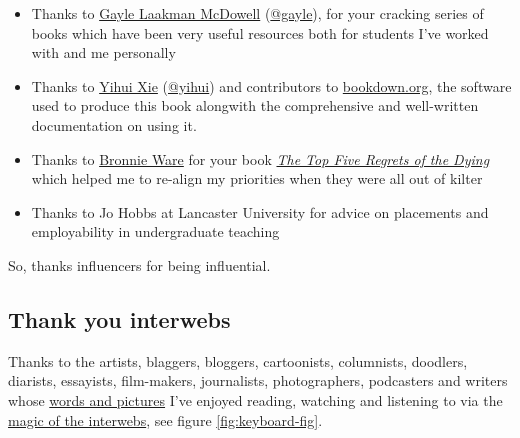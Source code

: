 \documentclass[
]{book}
\providecommand{\tightlist}{%
  \setlength{\itemsep}{0pt}\setlength{\parskip}{0pt}}
\begin{document}
\begin{itemize}
\tightlist
\item
  Thanks to \href{https://en.wikipedia.org/wiki/Gayle_Laakmann_McDowell}{Gayle Laakman McDowell} (\href{https://twitter.com/gayle}{@gayle}), for your cracking series of books \citep{techcareer, cracking, crackingpm, crackingthepmcareer} which have been very useful resources both for students I've worked with and me personally
\item
  Thanks to \href{https://en.wikipedia.org/wiki/Yihui_Xie}{Yihui Xie} (\href{https://github.com/yihui}{@yihui}) and contributors to \href{https://bookdown.org}{bookdown.org}, the software used to produce this book alongwith the comprehensive and well-written documentation on using it. \citep{xie2017, xie2015, xie2020}
\item
  Thanks to \href{https://en.wikipedia.org/wiki/Bronnie_Ware}{Bronnie Ware} for your book \emph{\href{https://en.wikipedia.org/wiki/The_Top_Five_Regrets_of_the_Dying}{The Top Five Regrets of the Dying}} \citep{regrets} which helped me to re-align my priorities when they were all out of kilter
\item
  Thanks to Jo Hobbs at Lancaster University for advice on placements and employability in undergraduate teaching
\end{itemize}

So, thanks influencers for being influential. 🙏

\hypertarget{bloggers}{%
\subsection{Thank you interwebs}\label{bloggers}}

Thanks to the artists, blaggers, bloggers, cartoonists, columnists, doodlers, diarists, essayists, film-makers, journalists, photographers, podcasters and writers whose \href{https://en.wikipedia.org/wiki/Words_and_Pictures_(TV_programme)}{words and pictures} I've enjoyed reading, watching and listening to via the \href{https://en.wiktionary.org/wiki/interweb}{magic of the interwebs}, see figure \ref{fig:keyboard-fig}.
\end{document}
